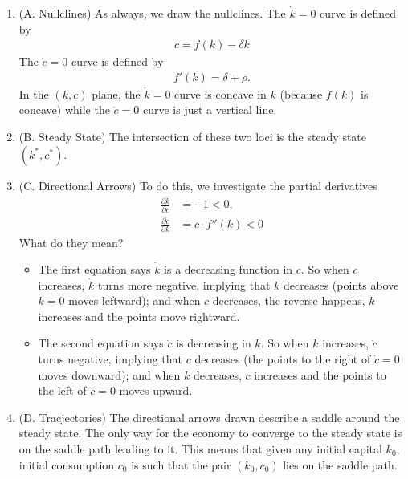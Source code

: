 \documentclass[11pt,a4paper]{book}
\theoremstyle{definition}\newtheorem{definition}{Definition}
\theoremstyle{definition}\newtheorem{fact}{Fact}
\theoremstyle{definition}\newtheorem{remark}{Remark}
\theoremstyle{definition}\newtheorem{ex}{Ex.}
\theoremstyle{definition}\newtheorem{project}{Project}
\theoremstyle{definition}\newtheorem{problem}{Problem}
\theoremstyle{definition}\newtheorem{example}{Example}
\numberwithin{theorem}{section}
\numberwithin{corollary}{chapter}
\numberwithin{assumption}{chapter}
\numberwithin{definition}{chapter}
\numberwithin{prop}{chapter}
\numberwithin{notation}{chapter}
\numberwithin{problem}{chapter}
\numberwithin{example}{chapter}
\numberwithin{fact}{chapter}
\numberwithin{ex}{chapter}
\begin{document}
	\begin{enumerate}
		\item (A. Nullclines) As always, we draw the nullclines. The $\dot{k}=0$ curve is defined by
		\begin{align*}
			c = f(k) - \delta k
		\end{align*}
		The $\dot{c} = 0$ curve is defined by 
		\begin{align*}
			f'(k) = \delta + \rho.
		\end{align*}
		In the $(k,c)$ plane, the $\dot{k}=0$ curve is concave in $k$ (because $f(k)$ is concave) while the $\dot{c}=0$ curve is just a vertical line.
		\item (B. Steady State) The intersection of these two loci is the steady state $(k^*, c^*)$.
		\item (C. Directional Arrows)  To do this, we investigate the partial derivatives
		\begin{align*}
			\frac{\partial \dot{k}}{\partial c} &= - 1 < 0, \\
			\frac{\partial \dot{c}}{\partial k} &= c \cdot f''(k) < 0
		\end{align*}
		What do they mean?
		\begin{itemize}
			\item The first equation says $\dot{k}$ is a decreasing function in $c$. So when $c$ increases, $\dot{k}$ turns more negative, implying that $k$ decreases (points above $\dot{k}=0$ moves leftward); and when $c$ decreases, the reverse happens, $k$ increases and the points move rightward.
			\item The second equation says $\dot{c}$ is decreasing in $k$. So when $k$ increases, $\dot{c}$ turns negative, implying that $c$ decreases (the points to the right of $\dot{c}=0$ moves downward); and when $k$ decreases, $c$ increases and the points to the left of $\dot{c}=0$ moves upward.
		\end{itemize}
		\item (D. Tracjectories)  The directional arrows drawn describe a saddle around the steady state. The
		only way for the economy to converge to the steady state is on the saddle path leading
		to it. This means that given any initial capital $k_0$, initial consumption $c_0$ is such that the
		pair $(k_0, c_0)$ lies on the saddle path.
	\end{enumerate}
	
\end{document}
